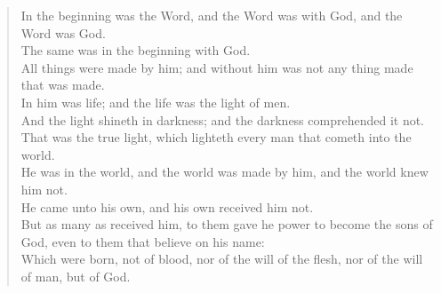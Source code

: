 \documentclass[MAIN]{subfiles}
\begin{document}
\begin{verse}
In the beginning was the Word, and the Word was with God, and the Word was God.\\
The same was in the beginning with God.\\
All things were made by him; and without him was not any thing made that was made.\\
In him was life; and the life was the light of men.\\
And the light shineth in darkness; and the darkness comprehended it not.\\
That was the true light, which lighteth every man that cometh into the world.\\
He was in the world, and the world was made by him, and the world knew him not.\\
He came unto his own, and his own received him not.\\
But as many as received him, to them gave he power to become the sons of God, even to them that believe on his name:\\
Which were born, not of blood, nor of the will of the flesh, nor of the will of man, but of God.
\end{verse}
\end{document}
